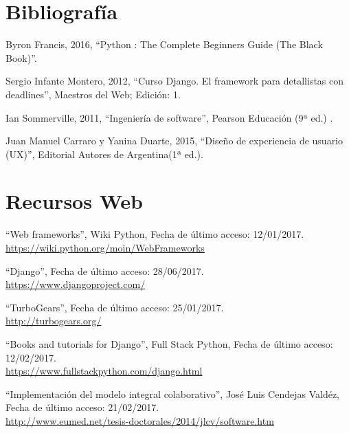 \section{Bibliografía}




Byron Francis, 2016, ``Python : The Complete Beginners Guide (The Black Book)''. 


Sergio Infante Montero, 2012, ``Curso Django. El framework para detallistas con deadlines'', Maestros del Web; Edición: 1.

Ian Sommerville, 2011, ``Ingeniería de software'', Pearson Educación (9ª ed.) .

  Juan Manuel Carraro y Yanina Duarte, 2015, ``Diseño de experiencia de usuario (UX)'', Editorial Autores de Argentina(1ª ed.).



\section{Recursos Web}

``Web frameworks'', Wiki Python, Fecha de último acceso: 12/01/2017.\\\href{https://wiki.python.org/moin/WebFrameworks}{https://wiki.python.org/moin/WebFrameworks}

``Django'', Fecha de último acceso: 28/06/2017.\\\href{https://www.djangoproject.com/}{https://www.djangoproject.com/}

``TurboGears'', Fecha de último acceso: 25/01/2017.\\\href{http://turbogears.org/}{http://turbogears.org/}


``Books and tutorials for Django'', Full Stack Python, Fecha de último acceso: 12/02/2017.\\\href{https://www.fullstackpython.com/django.html}{https://www.fullstackpython.com/django.html}

``Implementación del modelo integral colaborativo'', José Luis Cendejas Valdéz, Fecha de último acceso: 21/02/2017.\\\href{http://www.eumed.net/tesis-doctorales/2014/jlcv/software.htm}{http://www.eumed.net/tesis-doctorales/2014/jlcv/software.htm}


